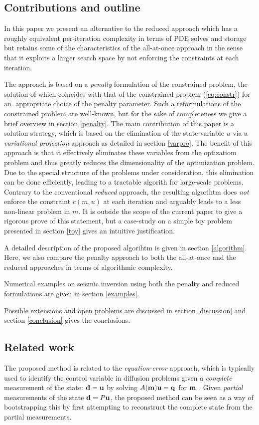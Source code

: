 \documentclass{iopart}
\begin{document}
\subsection{Contributions and outline}
In this paper we present an alternative to the reduced approach which
has a roughly equivalent per-iteration complexity in terms of PDE solves
and storage but retains some of the characteristics of the all-at-once
approach in the sense that it exploits a larger search space by not
enforcing the constraints at each iteration.

The approach is based on a \emph{penalty} formulation of the constrained problem,
the solution of which coincides with that of the constrained problem (\ref{eq:constr}) for an. 
appropriate choice of the penalty parameter.
Such a reformulations of the constrained problem are well-known, 
but for the sake of completeness we give a brief overview in section \ref{penalty}. The main contribution
of this paper is a solution strategy, which is based on the elimination of the state variable $u$ via
a \emph{variational projection} approach as detailed in section \ref{varpro}. The benefit of this approach is
that it effectively eliminates these variables from the optizatiom problem and thus greatly reduces the dimensionality
of the optimization problem. Due to the special structure of the problems under consideration, this elimination 
can be done efficiently, leading to a tractable algorith for large-scale problems. 
Contrary to the conventional \emph{reduced} approach, the resulting algorihtm does \emph{not} enforce the constraint
$c(m,u)$ at each iteration and arguably leads to a less non-linear problem in $m$. It is outside the scope of the current
paper to give a rigorous prove of this statement, but a case-study on a simple toy problem presented in section
 \ref{toy} gives an intuitive justification.

A detailed description of the proposed algorihtm is given in section \ref{algorithm}.
Here, we also compare the penalty approach to both the all-at-once and the
reduced approaches in terms of algorithmic complexity.

Numerical
examples on seismic inversion using both the penalty and reduced
formulations are given in section \ref{examples}.

Possible extensions and open problems are discussed in section
\ref{discussion} and section \ref{conclusion} gives the conclusions.

\subsection{Related work}
The proposed method is related to the \emph{equation-error} approach,
which is typically used to identify the control variable in diffusion
problems given a \emph{complete} measurement of the state: $\mathbf{d} = \mathbf{u}$ by
solving $A(\mathbf{m})\mathbf{u} = \mathbf{q}$ for $\mathbf{m}$ \cite{Richter1981,Banerjee2013}. 
Given \emph{partial} measurements of the state $\mathbf{d} = P\mathbf{u}$, the proposed method can be seen as a
way of bootstrapping this by first attempting to reconstruct the complete
state from the partial measurements. 
\end{document}
